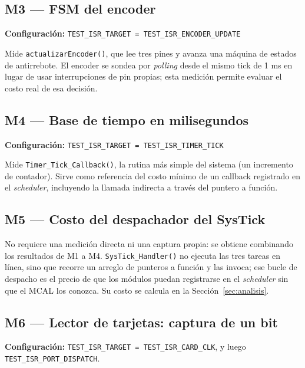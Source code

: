 \documentclass[11pt,a4paper]{article}
\begin{document}
\subsection{M3 --- FSM del encoder}
\textbf{Configuración:} \texttt{TEST\_ISR\_TARGET = TEST\_ISR\_ENCODER\_UPDATE}

Mide \texttt{actualizarEncoder()}, que lee tres pines y avanza una máquina
de estados de antirrebote. El encoder se sondea por \textit{polling} desde
el mismo tick de 1 ms en lugar de usar interrupciones de pin propias; esta
medición permite evaluar el costo real de esa decisión.

\subsection{M4 --- Base de tiempo en milisegundos}
\textbf{Configuración:} \texttt{TEST\_ISR\_TARGET = TEST\_ISR\_TIMER\_TICK}

Mide \texttt{Timer\_Tick\_Callback()}, la rutina más simple del sistema (un
incremento de contador). Sirve como referencia del costo mínimo de un
callback registrado en el \textit{scheduler}, incluyendo la llamada
indirecta a través del puntero a función.

\subsection{M5 --- Costo del despachador del SysTick}
No requiere una medición directa ni una captura propia: se obtiene
combinando los resultados de M1 a M4. \texttt{SysTick\_Handler()} no ejecuta
las tres tareas en línea, sino que recorre un arreglo de punteros a función
y las invoca; ese bucle de despacho es el precio de que los módulos puedan
registrarse en el \textit{scheduler} sin que el MCAL los conozca. Su costo
se calcula en la Sección~\ref{sec:analisis}.

\subsection{M6 --- Lector de tarjetas: captura de un bit}
\textbf{Configuración:} \texttt{TEST\_ISR\_TARGET = TEST\_ISR\_CARD\_CLK}, y
luego \texttt{TEST\_ISR\_PORT\_DISPATCH}.
\end{document}
